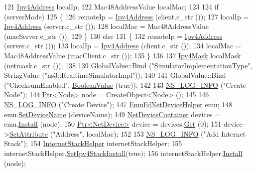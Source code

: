 \begin{DoxyCode}
121   \hyperlink{classns3_1_1Ipv4Address}{Ipv4Address} localIp;
122   Mac48AddressValue localMac;
123   
124   \textcolor{keywordflow}{if} (serverMode)
125   \{
126      remoteIp = \hyperlink{classns3_1_1Ipv4Address}{Ipv4Address} (client.c\_str ());
127      localIp = \hyperlink{classns3_1_1Ipv4Address}{Ipv4Address} (server.c\_str ());
128      localMac = Mac48AddressValue (macServer.c\_str ());
129   \}
130   \textcolor{keywordflow}{else}
131   \{
132      remoteIp = \hyperlink{classns3_1_1Ipv4Address}{Ipv4Address} (server.c\_str ());
133      localIp = \hyperlink{classns3_1_1Ipv4Address}{Ipv4Address} (client.c\_str ());
134      localMac =  Mac48AddressValue (macClient.c\_str ());
135   \}
136 
137   \hyperlink{classns3_1_1Ipv4Mask}{Ipv4Mask} localMask (netmask.c\_str ());
138   
139   GlobalValue::Bind (\textcolor{stringliteral}{"SimulatorImplementationType"}, StringValue (\textcolor{stringliteral}{"ns3::RealtimeSimulatorImpl"}));
140 
141   GlobalValue::Bind (\textcolor{stringliteral}{"ChecksumEnabled"}, \hyperlink{classns3_1_1BooleanValue}{BooleanValue} (\textcolor{keyword}{true}));
142 
143   \hyperlink{group__logging_gafbd73ee2cf9f26b319f49086d8e860fb}{NS\_LOG\_INFO} (\textcolor{stringliteral}{"Create Node"});
144   \hyperlink{classns3_1_1Ptr}{Ptr<Node>} node = CreateObject<Node> ();
145 
146   \hyperlink{group__logging_gafbd73ee2cf9f26b319f49086d8e860fb}{NS\_LOG\_INFO} (\textcolor{stringliteral}{"Create Device"});
147   \hyperlink{classns3_1_1EmuFdNetDeviceHelper}{EmuFdNetDeviceHelper} emu;
148   emu.\hyperlink{classns3_1_1EmuFdNetDeviceHelper_aa5c26a78442e507ba969f28ffa5f748e}{SetDeviceName} (deviceName);
149   \hyperlink{classns3_1_1NetDeviceContainer}{NetDeviceContainer} devices = emu.\hyperlink{classns3_1_1FdNetDeviceHelper_af70d55cbb4f6411c33cacb84eb651ad5}{Install} (node);
150   \hyperlink{classns3_1_1Ptr}{Ptr<NetDevice>} device = devices.\hyperlink{classns3_1_1NetDeviceContainer_a677d62594b5c9d2dea155cc5045f4d0b}{Get} (0);
151   device->\hyperlink{classns3_1_1ObjectBase_ac60245d3ea4123bbc9b1d391f1f6592f}{SetAttribute} (\textcolor{stringliteral}{"Address"}, localMac);
152 
153   \hyperlink{group__logging_gafbd73ee2cf9f26b319f49086d8e860fb}{NS\_LOG\_INFO} (\textcolor{stringliteral}{"Add Internet Stack"});
154   \hyperlink{classns3_1_1InternetStackHelper}{InternetStackHelper} internetStackHelper;
155   internetStackHelper.\hyperlink{classns3_1_1InternetStackHelper_a10e2a35f410d0d1c90d979542c8bfd6e}{SetIpv4StackInstall}(\textcolor{keyword}{true});
156   internetStackHelper.\hyperlink{classns3_1_1InternetStackHelper_a6645b412f31283d2d9bc3d8a95cebbc0}{Install} (node);

\end{DoxyCode}
